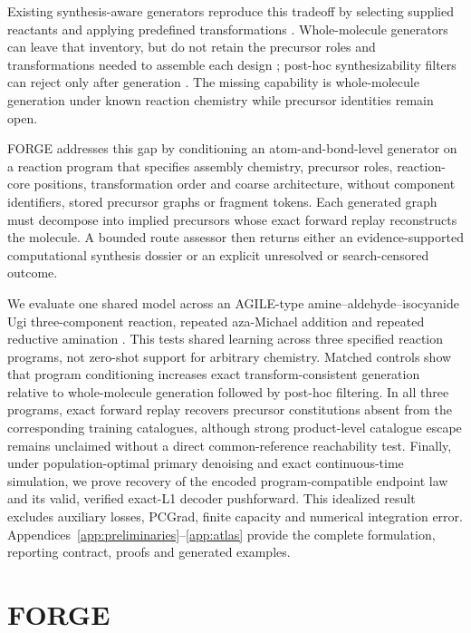 \documentclass{article}
\begin{document}
Existing synthesis-aware generators reproduce this tradeoff by selecting supplied reactants and
applying predefined transformations \citep{gao2022amortized,koziarski2024rgfn,cretu2025synflownet}.
Whole-molecule generators can leave that inventory, but do not retain the precursor roles and
transformations needed to assemble each design \citep{qin2025defog,lee2025genmol}; post-hoc
synthesizability filters can reject only after generation \citep{gao2020synthesizability}. The missing
capability is whole-molecule generation under known reaction chemistry while precursor identities
remain open.

FORGE addresses this gap by conditioning an atom-and-bond-level generator on a reaction program that
specifies assembly chemistry, precursor roles, reaction-core positions, transformation order and
coarse architecture, without component identifiers, stored precursor graphs or fragment tokens. Each
generated graph must decompose into implied precursors whose exact forward replay reconstructs the
molecule. A bounded route assessor then returns either an evidence-supported computational synthesis
dossier or an explicit unresolved or search-censored outcome.

We evaluate one shared model across an AGILE-type amine--aldehyde--isocyanide Ugi three-component
reaction, repeated aza-Michael addition and repeated reductive amination
\citep{xu2024agile,li2023combinatorial,xue2024barcoding}. This tests shared learning across three
specified reaction programs, not zero-shot support for arbitrary chemistry. Matched controls show
that program conditioning increases exact transform-consistent generation relative to whole-molecule
generation followed by post-hoc filtering. In all three programs, exact forward replay recovers
precursor constitutions absent from the corresponding training catalogues, although strong
product-level catalogue escape remains unclaimed without a direct common-reference reachability
test. Finally, under population-optimal primary denoising and exact continuous-time simulation, we
prove recovery of the encoded program-compatible endpoint law and its valid, verified exact-L1
decoder pushforward. This idealized result excludes auxiliary losses, PCGrad, finite capacity and
numerical integration error. Appendices~\ref{app:preliminaries}--\ref{app:atlas} provide the complete
formulation, reporting contract, proofs and generated examples.

\section{FORGE}
\end{document}
